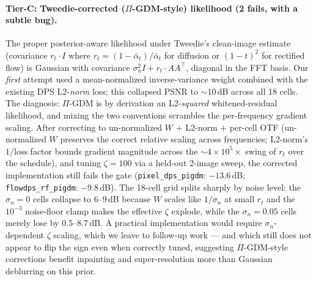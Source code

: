 \documentclass{article}
\begin{document}
\paragraph{Tier-C: Tweedie-corrected ($\Pi$-GDM-style) likelihood (2 fails, with a subtle bug).}
The proper posterior-aware likelihood under Tweedie's clean-image
estimate (covariance $r_t \cdot I$ where
$r_t = (1-\bar\alpha_t)/\bar\alpha_t$ for diffusion or $(1-t)^2$
for rectified flow) is Gaussian with covariance
$\sigma_n^2 I + r_t \cdot A A^\top$, diagonal in the FFT basis. Our
\emph{first} attempt used a mean-normalized inverse-variance weight
combined with the existing DPS L2-\emph{norm} loss; this collapsed
PSNR to $\sim$10\,dB across all 18 cells. The diagnosis: $\Pi$-GDM is
by derivation an L2-\emph{squared} whitened-residual likelihood, and
mixing the two conventions scrambles the per-frequency gradient
scaling. After correcting to un-normalized $W$ $+$ L2-norm $+$ per-cell
OTF (un-normalized $W$ preserves the correct relative scaling across
frequencies; L2-norm's $1/\text{loss}$ factor bounds gradient
magnitude across the ${\sim}4 \times 10^5{\times}$ swing of $r_t$
over the schedule), and tuning $\zeta{=}100$ via a held-out 2-image
sweep, the corrected implementation still fails the gate
(\texttt{pixel\_dps\_pigdm}: $-13.6$\,dB; \texttt{flowdps\_rf\_pigdm}:
$-9.8$\,dB). The 18-cell grid splits sharply by noise level: the
$\sigma_n{=}0$ cells collapse to 6--9\,dB because $W$ scales like
$1/\sigma_n$ at small $r_t$ and the $10^{-3}$ noise-floor clamp makes
the effective $\zeta$ explode, while the $\sigma_n{=}0.05$ cells
merely lose by $0.5$--$8.7$\,dB. A practical implementation would
require $\sigma_n$-dependent $\zeta$ scaling, which we leave to
follow-up work --- and which still does not appear to flip the sign
even when correctly tuned, suggesting $\Pi$-GDM-style corrections
benefit inpainting and super-resolution more than Gaussian
deblurring on this prior.
\end{document}
